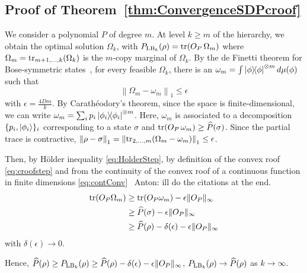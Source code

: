 \documentclass[aps,pra,twocolumn,showpacs,superscriptaddress,groupedaddress]{revtex4-2}
\newcommand{\anton}[1]{{\color{antongreen} Anton: #1}}
\begin{document}
\begin{widetext}



\appendix



\section{Proof of Theorem~\ref{thm:ConvergenceSDPcroof}}\label{app:ProofCongNonExtHier}
We consider a polynomial $P$ of degree $m$. At level $k \geq m$ of the hierarchy, we obtain the optimal solution $\Omega_k$, with $P_{{\rm LB}_k}(\rho) = \tr(O_P\, \Omega_m)$ where $\Omega_m = \tr_{m+1,\dots, k}(\Omega_k)$ is the $m$-copy marginal of $\Omega_k$.
By the de Finetti theorem for Bose-symmetric states~\cite[Thm.~II.8]{Christandl_2007}, for every feasible $\Omega_k$, there is an $\omega_m = \int \dyad{\phi}^{\otimes m} d\mu(\phi)$ such that
\begin{equation}
    \left\|\Omega_m - \omega_m\right\|_1 \leq \epsilon
\end{equation}
with $\epsilon = \tfrac{4 D m}{k}$. By Carath\'eodory's theorem, since the space is finite-dimensional, we can write $\omega_m = \sum_i p_i \dyad{\phi_i}^{\otimes m}$. Here, $\omega_m$ is associated to a decomposition $\{p_i, \ket{\phi_i}\}_i$ corresponding to a state $\sigma$ and $\tr(O_P \,\omega_m) \geq \widehat{P}(\sigma)$. Since the partial trace is contractive, $\left\|\rho - \sigma\right\|_1 = \left\|\tr_{2,\dots, m}(\Omega_m - \omega_m)\right\|_1 \leq \epsilon$.

Then, by H\"{o}lder inequality \eqref{eq:HolderStep}, by definition of the convex roof \eqref{eq:croofstep} and from the continuity of the convex roof of a continuous function in finite dimensions \eqref{eq:contConv}~\cite{LOOkupCitations}\anton{ill do the citations at the end}.
\begin{align}
    \tr(O_P \Omega_m) &\geq \tr(O_P\omega_m) - \epsilon\|O_P\|_\infty \label{eq:HolderStep}\\
    &\geq \widehat{P}(\sigma) - \epsilon\|O_P\|_\infty \label{eq:croofstep}\\
    &\geq \widehat{P}(\rho) - \delta(\epsilon) - \epsilon\|O_P\|_\infty \label{eq:contConv}
\end{align}
with $\delta(\epsilon) \to 0$.

Hence, $\widehat{P}{(\rho)} \geq P_{{\rm LB}_k}(\rho) \geq \widehat{P}{(\rho)} -\delta(\epsilon) - \epsilon\|O_P\|_\infty$, $P_{{\rm LB}_k}(\rho) \to \widehat{P}(\rho)$ as $k \to \infty$.


\end{widetext}
\end{document}
